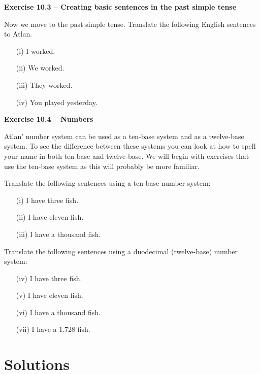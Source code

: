 \noindent \textbf{Exercise 10.3 -- Creating basic sentences in the past simple tense} 

Now we move to the past simple tense. Translate the following English sentences to Atlan. 
\begin{itemize}
    \item[(i)]I worked. 

    \item[(ii)]We worked. 

    \item[(iii)]They worked. 

    \item[(iv)]You played yesterday. 
\end{itemize}
 

\noindent \textbf{Exercise 10.4 -- Numbers} 

Atlan’ number system can be used as a ten-base system and as a twelve-base system. To see the difference between these systems you can look at how to spell your name in both ten-base and twelve-base. We will begin with exercises that use the ten-base system as this will probably be more familiar. 

\noindent Translate the following sentences using a ten-base number system:


\begin{itemize}
    \item[(i)]I have three fish. 

    \item[(ii)]I have eleven fish. 

    \item[(iii)]I have a thousand fish. 
\end{itemize}
\noindent Translate the following sentences using a duodecimal (twelve-base) number system:
\begin{itemize}
    \item[(iv)]I have three fish. 

    \item[(v)]I have eleven fish. 

    \item[(vi)]I have a thousand fish. 

    \item[(vii)]I have a 1.728 fish.  
\end{itemize}
 

 
\pagebreak
 

 

\section{Solutions}
\small

